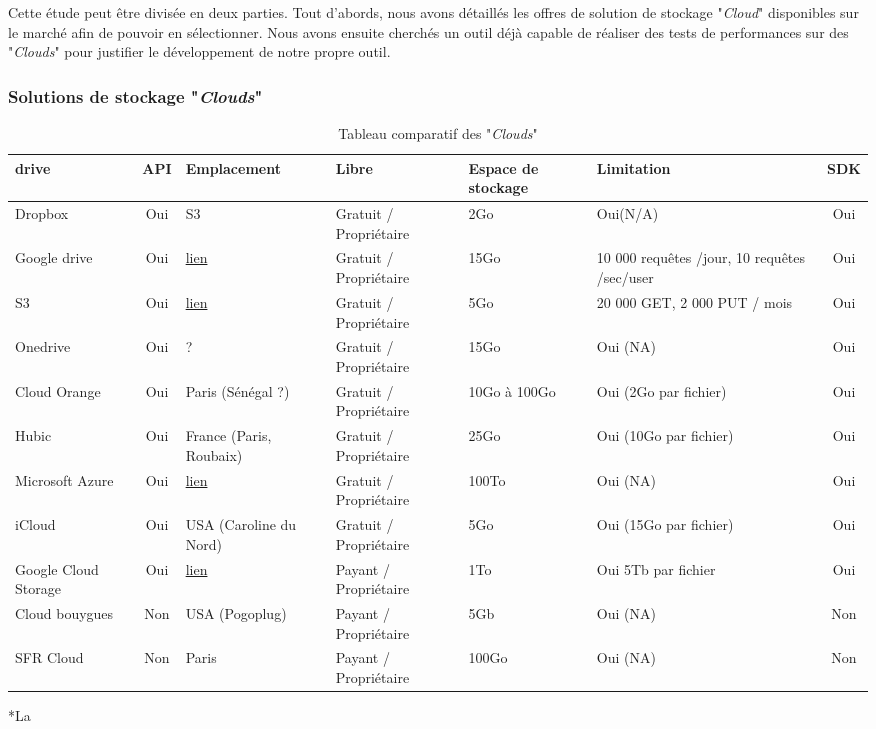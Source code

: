 \documentclass[10pt]{article}
\begin{document}
Cette étude peut être divisée en deux parties. Tout d’abords, nous avons
détaillés les offres de solution de stockage "\textit{Cloud}" disponibles sur le
marché afin de pouvoir en sélectionner. Nous avons ensuite cherchés un outil
déjà capable de réaliser des tests de performances sur des "\textit{Clouds}"
pour justifier le développement de notre propre outil.

\newpage

\subsubsection{Solutions de stockage "\textit{Clouds}"}

\begin{table}[!h] \caption{Tableau comparatif des "\textit{Clouds}"}
\renewcommand{\arraystretch}{1.5} \begin{center}
\begin{tabular}{|m{1in}|c|m{1in}|m{1in}|m{1in}|m{1in}|c|} \hline \bf\centering
drive & \bf API & \bf Emplacement & \bf Libre & \bf\centering Espace de stockage
& \bf Limitation & \bf SDK\\ \hline \centering Dropbox & Oui & S3 & Gratuit /
Propriétaire & 2Go & Oui(N/A) & Oui \\ \hline \centering Google drive & Oui  &
\href{http://www.google.com/about/datacenters/inside/locations/index.html}{lien}
& Gratuit / Propriétaire & 15Go & 10 000 requêtes /jour, 10 requêtes /sec/user &
Oui \\ \hline \centering S3 & Oui  &
\href{http://aws.amazon.com/fr/about-aws/global-infrastructure/}{lien} & Gratuit
/ Propriétaire & 5Go & 20 000 GET, 2 000 PUT / mois & Oui \\ \hline \centering
Onedrive & Oui  & ? & Gratuit / Propriétaire & 15Go & Oui (NA) & Oui \\ \hline
\centering Cloud Orange & Oui  & Paris (Sénégal ?) & Gratuit / Propriétaire &
10Go à 100Go & Oui (2Go par fichier) & Oui \\ \hline \centering Hubic & Oui  &
France (Paris, Roubaix) & Gratuit / Propriétaire & 25Go & Oui (10Go par fichier)
& Oui \\ \hline \centering Microsoft Azure & Oui  &
\href{http://azure.microsoft.com/en-us/regions/}{lien} & Gratuit / Propriétaire
& 100To & Oui (NA) & Oui \\ \hline \centering iCloud & Oui  & USA (Caroline du
Nord) & Gratuit / Propriétaire & 5Go & Oui (15Go par fichier) & Oui \\ \hline
\centering Google Cloud Storage & Oui  &
\href{http://www.google.com/about/datacenters/inside/locations/index.html}{lien}
& Payant  / Propriétaire & 1To & Oui 5Tb par fichier & Oui \\ \hline \centering
Cloud bouygues & Non  & USA (Pogoplug) & Payant  / Propriétaire & 5Gb & Oui (NA)
& Non \\ \hline \centering SFR Cloud & Non & Paris & Payant / Propriétaire &
100Go & Oui (NA) & Non \\ \hline \end{tabular} \end{center} \end{table} *La
\end{document}
